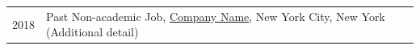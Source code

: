 
\begin{longtable}[l]{@{}p{} p{}@{}}

    2018 & Past Non-academic Job, \href{https://example.com/}{Company Name}, New York City, New York (Additional detail) \\

\end{longtable}